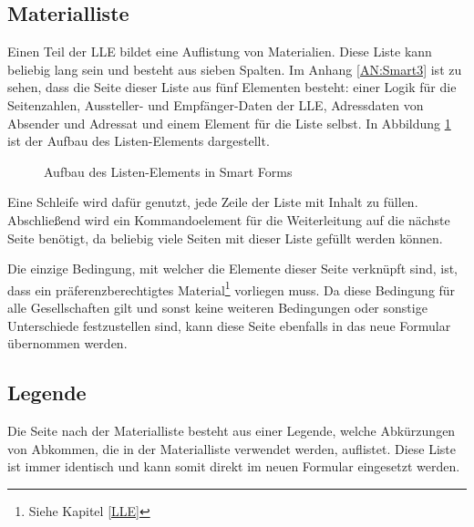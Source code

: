 	\subsection{Materialliste}
	
	Einen Teil der \ac{LLE} bildet eine Auflistung von Materialien. Diese Liste kann beliebig lang sein und besteht aus sieben Spalten. Im Anhang \ref{AN:Smart3} ist zu sehen, dass die Seite dieser Liste aus fünf Elementen besteht: einer Logik für die Seitenzahlen, Aussteller- und Empfänger-Daten der \ac{LLE}, Adressdaten von Absender und Adressat und einem Element für die Liste selbst.
	In Abbildung \ref{list_smart} ist der Aufbau des Listen-Elements dargestellt.
	
	\begin{figure}[ht]
		\centering
		\caption{Aufbau des Listen-Elements in Smart Forms}
		\label{list_smart}
	\end{figure}
	
	Eine Schleife wird dafür genutzt, jede Zeile der Liste mit Inhalt zu füllen. Abschließend wird ein Kommandoelement für die Weiterleitung auf die nächste Seite benötigt, da beliebig viele Seiten mit dieser Liste gefüllt werden können.
	
	Die einzige Bedingung, mit welcher die Elemente dieser Seite verknüpft sind, ist, dass ein präferenzberechtigtes Material\footnote{Siehe Kapitel \ref{LLE}} vorliegen muss. Da diese Bedingung für alle Gesellschaften gilt und sonst keine weiteren Bedingungen oder sonstige Unterschiede festzustellen sind, kann diese Seite ebenfalls in das neue Formular übernommen werden. 
	
	\subsection{Legende}
	\label{ist:leg}
	
	Die Seite nach der Materialliste besteht aus einer Legende, welche Abkürzungen von Abkommen, die in der Materialliste verwendet werden, auflistet. Diese Liste ist immer identisch und kann somit direkt im neuen Formular eingesetzt werden.
	
